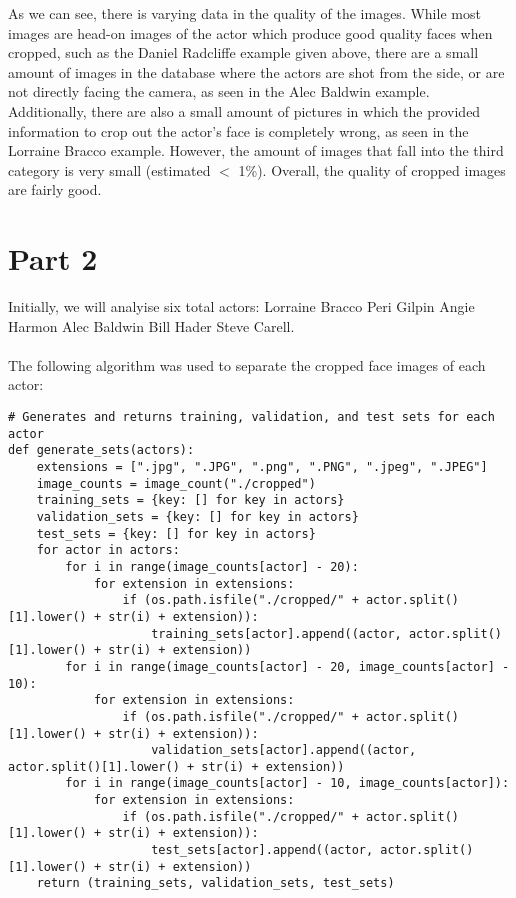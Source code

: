 \documentclass[11pt,a4paper]{report}
\begin{document}
As we can see, there is varying data in the quality of the images. While most images are head-on images of the actor which produce good quality faces when cropped, such as the Daniel Radcliffe example given above, there are a small amount of images in the database where the actors are shot from the side, or are not directly facing the camera, as seen in the Alec Baldwin example. Additionally, there are also a small amount of pictures in which the provided information to crop out the actor's face is completely wrong, as seen in the Lorraine Bracco example. However, the amount of images that fall into the third category is very small (estimated $<$ 1\%). Overall, the quality of cropped images are fairly good.

\section*{Part 2}
Initially, we will analyise six total actors: Lorraine Bracco Peri Gilpin Angie Harmon Alec Baldwin Bill Hader Steve Carell. \\\\
The following algorithm was used to separate the cropped face images of each actor: 

\begin{lstlisting}
# Generates and returns training, validation, and test sets for each actor
def generate_sets(actors):
    extensions = [".jpg", ".JPG", ".png", ".PNG", ".jpeg", ".JPEG"]
    image_counts = image_count("./cropped")
    training_sets = {key: [] for key in actors}
    validation_sets = {key: [] for key in actors}
    test_sets = {key: [] for key in actors}
    for actor in actors:
        for i in range(image_counts[actor] - 20):
            for extension in extensions:
                if (os.path.isfile("./cropped/" + actor.split()[1].lower() + str(i) + extension)):
                    training_sets[actor].append((actor, actor.split()[1].lower() + str(i) + extension))
        for i in range(image_counts[actor] - 20, image_counts[actor] - 10):
            for extension in extensions:
                if (os.path.isfile("./cropped/" + actor.split()[1].lower() + str(i) + extension)):
                    validation_sets[actor].append((actor, actor.split()[1].lower() + str(i) + extension))
        for i in range(image_counts[actor] - 10, image_counts[actor]):
            for extension in extensions:
                if (os.path.isfile("./cropped/" + actor.split()[1].lower() + str(i) + extension)):
                    test_sets[actor].append((actor, actor.split()[1].lower() + str(i) + extension))
    return (training_sets, validation_sets, test_sets)
\end{lstlisting}	
\end{document}
